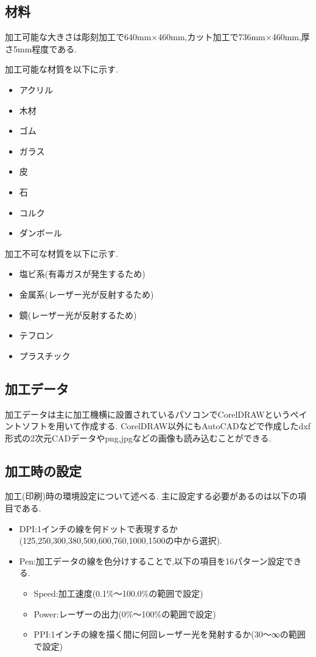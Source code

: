 \documentclass[12pt,oneside]{sotsuken_paper}
\begin{document}
\subsection{材料}
加工可能な大きさは彫刻加工で640mm×460mm,カット加工で736mm×460mm,厚さ5mm程度である.

加工可能な材質を以下に示す.

\begin{itemize}
	\item アクリル
	\item 木材
	\item ゴム
	\item ガラス
	\item 皮
	\item 石
	\item コルク
	\item ダンボール
\end{itemize}

加工不可な材質を以下に示す.

\begin{itemize}
	\item 塩ビ系(有毒ガスが発生するため)
	\item 金属系(レーザー光が反射するため)
	\item 鏡(レーザー光が反射するため)
	\item テフロン
	\item プラスチック
\end{itemize}

\subsection{加工データ}
加工データは主に加工機横に設置されているパソコンでCorelDRAWというペイントソフトを用いて作成する.
CorelDRAW以外にもAutoCADなどで作成したdxf形式の2次元CADデータやpng,jpgなどの画像も読み込むことができる.

\subsection{加工時の設定}
加工(印刷)時の環境設定について述べる.
主に設定する必要があるのは以下の項目である.

\begin{itemize}
	\item DPI:1インチの線を何ドットで表現するか(125,250,300,380,500,600,760,1000,1500の中から選択).
	\item Pen:加工データの線を色分けすることで,以下の項目を16パターン設定できる.
		\begin{itemize}
			\item Speed:加工速度(0.1\%～100.0\%の範囲で設定)
			\item Power:レーザーの出力(0\%～100\%の範囲で設定)
			\item PPI:1インチの線を描く間に何回レーザー光を発射するか(30～∞の範囲で設定)
		\end{itemize}
\end{itemize}
\end{document}

